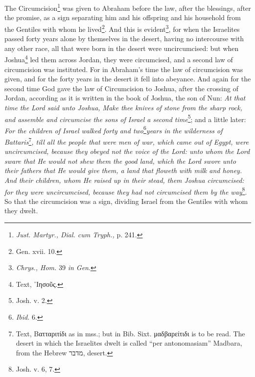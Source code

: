 The Circumcision\footnote{\emph{Just. Martyr., Dial. cum Tryph., }p. 241.} was given to Abraham before the law, after the blessings, after the promise, as a sign separating him and his offspring and his household from the Gentiles with whom he lived\footnote{Gen. xvii. 10.}. And this is evident\footnote{\emph{Chrys., Hom. }39 \emph{in Gen}.}, for when the Israelites passed forty years alone by themselves in the desert, having no intercourse with any other race, all that were born in the desert were uncircumcised: but when Joshua\footnote{Text, \textgreek{᾽Ιησοῦς}.} led them across Jordan, they were circumcised, and a second law of circumcision was instituted. For in Abraham’s time the law of circumcision was given, and for the forty years in the desert it fell into abeyance. And again for the second time God gave the law of Circumcision to Joshua, after the crossing of Jordan, according as it is written in the book of Joshua, the son of Nun: \emph{At that time the Lord said unto Joshua, Make thee knives of stone from the sharp rock, and assemble and circumcise the sons of Israel a second time}\footnote{Josh. v. 2.}; and a little later: \emph{For the children of Israel walked forty and two}\footnote{\emph{Ibid.} 6.}\emph{years in the wilderness of Battaris}\footnote{Text, \textgreek{Βατταριτίδι} as in mss.; but in Bib. Sixt. \textgreek{μαδβαρείτιδι} is to be read. The desert in which the Israelites dwelt is called “per antonomasiam” Madbara, from the Hebrew \texthebrew{מדבר}, desert.}\emph{, till all the people that were men of war, which came out of Egypt, were uncircumcised, because they obeyed not the voice of the Lord: unto whom the Lord sware that He would not shew them the good land, which the Lord swore unto their fathers that He would give them, a land that floweth with milk and honey. And their children, whom He raised up in their stead, them Joshua circumcised: for they were uncircumcised, because they had not circumcised them by the way}\footnote{Josh. v. 6, 7.}. So that the circumcision was a sign, dividing Israel from the Gentiles with whom they dwelt.

